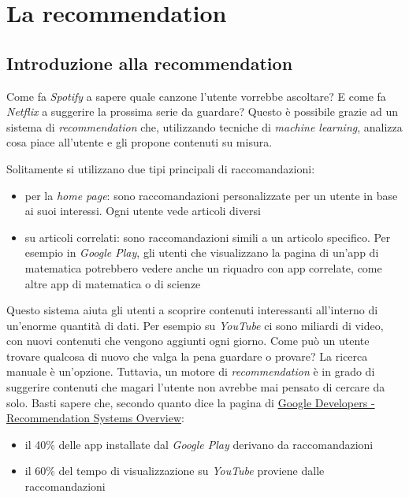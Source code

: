 \chapter{La recommendation}

\section{Introduzione alla recommendation}

Come fa \textit{Spotify} a sapere quale canzone l'utente vorrebbe ascoltare? E come fa \textit{Netflix} a suggerire la prossima serie da guardare? Questo è possibile grazie ad un sistema di \textit{recommendation} che, utilizzando tecniche di \textit{machine learning}, analizza cosa piace all'utente e gli propone contenuti su misura. 

Solitamente si utilizzano due tipi principali di raccomandazioni:

\begin{itemize}
    \item per la \textit{home page}: sono raccomandazioni personalizzate per un utente in base ai suoi interessi. Ogni utente vede articoli diversi
    \item su articoli correlati: sono raccomandazioni simili a un articolo specifico. Per esempio in \textit{Google Play}, gli utenti che visualizzano la pagina di un'app di matematica potrebbero vedere anche un riquadro con app correlate, come altre app di matematica o di scienze
\end{itemize}

Questo sistema aiuta gli utenti a scoprire contenuti interessanti all'interno di un'enorme quantità di dati. Per esempio su \textit{YouTube} ci sono miliardi di video, con nuovi contenuti che vengono aggiunti ogni giorno. Come può un utente trovare qualcosa di nuovo che valga la pena guardare o provare? La ricerca manuale è un'opzione. Tuttavia, un motore di \textit{recommendation} è in grado di suggerire contenuti che magari l'utente non avrebbe mai pensato di cercare da solo. Basti sapere che, secondo quanto dice la pagina di \href{https://developers.google.com/machine-learning/recommendation/overview}{Google Developers - Recommendation Systems Overview}:

\begin{itemize}
    \item il 40\% delle app installate dal \textit{Google Play} derivano da raccomandazioni
    \item il 60\% del tempo di visualizzazione su \textit{YouTube} proviene dalle raccomandazioni
\end{itemize}

